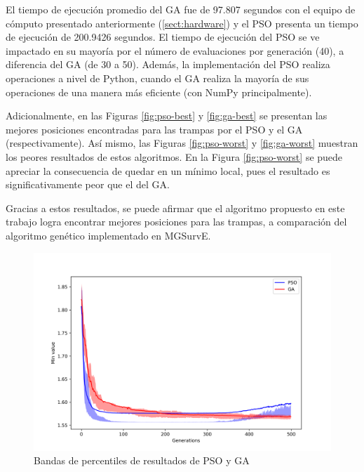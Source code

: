   El tiempo de ejecución promedio del GA fue de 97.807 segundos con el equipo
  de cómputo presentado anteriormente (\ref{sect:hardware}) y el PSO presenta
  un tiempo de ejecución de 200.9426 segundos. El tiempo de ejecución del PSO
  se ve impactado en su mayoría por el número de evaluaciones por generación
  (40), a diferencia del GA (de 30 a 50). Además, la implementación del PSO
  realiza operaciones a nivel de Python, cuando el GA realiza la mayoría de
  sus operaciones de una manera más eficiente (con NumPy principalmente).

  Adicionalmente, en las Figuras \ref{fig:pso-best} y \ref{fig:ga-best} se
  presentan las mejores posiciones encontradas para las trampas por el PSO y
  el GA (respectivamente). Así mismo, las Figuras \ref{fig:pso-worst} y
  \ref{fig:ga-worst} muestran los peores resultados de estos algoritmos. En la
  Figura \ref{fig:pso-worst} se puede apreciar la consecuencia de quedar en un
  mínimo local, pues el resultado es significativamente peor que el del GA. 

  Gracias a estos resultados, se puede afirmar que el algoritmo propuesto en
  este trabajo logra encontrar mejores posiciones para las trampas, a
  comparación del algoritmo genético implementado en MGSurvE.

  \begin{figure}[ht!]
    \centering
    \includegraphics[width=\textwidth]{percentile.png}
    \caption{Bandas de percentiles de resultados de PSO y GA}
    \label{fig:percentile}
  \end{figure}

